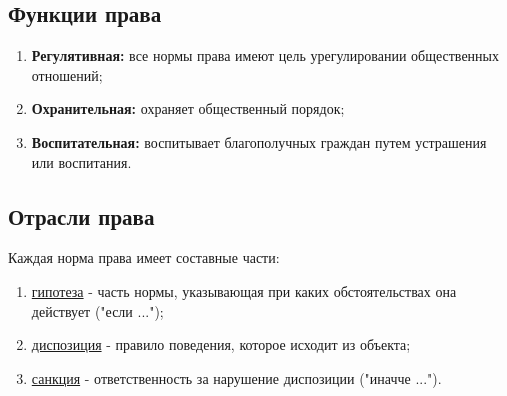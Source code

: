 \documentclass[a5paper,10pt]{article}
\begin{document}
		\subsection{Функции права}
			\begin{enumerate}
				\item \textbf{Регулятивная:} все нормы права имеют цель урегулировании общественных отношений;

				\item \textbf{Охранительная:} охраняет общественный порядок;

				\item \textbf{Воспитательная:} воспитывает благополучных граждан путем устрашения или воспитания.
			\end{enumerate}

		\subsection{Отрасли права}
			Каждая норма права имеет составные части:
			\begin{enumerate}
				\item \underline{гипотеза} - часть нормы, указывающая при каких обстоятельствах она действует ("если ...");

				\item \underline{диспозиция} - правило поведения, которое исходит из объекта;

				\item \underline{санкция} - ответственность за нарушение диспозиции ("иначче ...").
			\end{enumerate}
\end{document}
